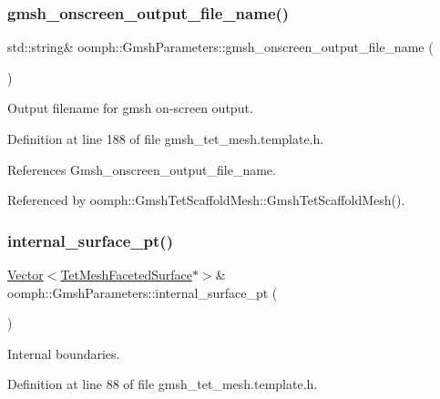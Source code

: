\subsubsection{\texorpdfstring{gmsh\+\_\+onscreen\+\_\+output\+\_\+file\+\_\+name()}{gmsh\_onscreen\_output\_file\_name()}}
{\footnotesize\ttfamily std\+::string\& oomph\+::\+Gmsh\+Parameters\+::gmsh\+\_\+onscreen\+\_\+output\+\_\+file\+\_\+name (\begin{DoxyParamCaption}{ }\end{DoxyParamCaption})\hspace{0.3cm}{\ttfamily [inline]}}



Output filename for gmsh on-\/screen output. 



Definition at line 188 of file gmsh\+\_\+tet\+\_\+mesh.\+template.\+h.



References Gmsh\+\_\+onscreen\+\_\+output\+\_\+file\+\_\+name.



Referenced by oomph\+::\+Gmsh\+Tet\+Scaffold\+Mesh\+::\+Gmsh\+Tet\+Scaffold\+Mesh().

\mbox{\label{classoomph_1_1GmshParameters_a10f845ea8fb16bf617f5c6ca05e21bf9}} 
\subsubsection{\texorpdfstring{internal\+\_\+surface\+\_\+pt()}{internal\_surface\_pt()}}
{\footnotesize\ttfamily \hyperlink{classoomph_1_1Vector}{Vector}$<$\hyperlink{classoomph_1_1TetMeshFacetedSurface}{Tet\+Mesh\+Faceted\+Surface}$\ast$$>$\& oomph\+::\+Gmsh\+Parameters\+::internal\+\_\+surface\+\_\+pt (\begin{DoxyParamCaption}{ }\end{DoxyParamCaption})\hspace{0.3cm}{\ttfamily [inline]}}



Internal boundaries. 



Definition at line 88 of file gmsh\+\_\+tet\+\_\+mesh.\+template.\+h.



